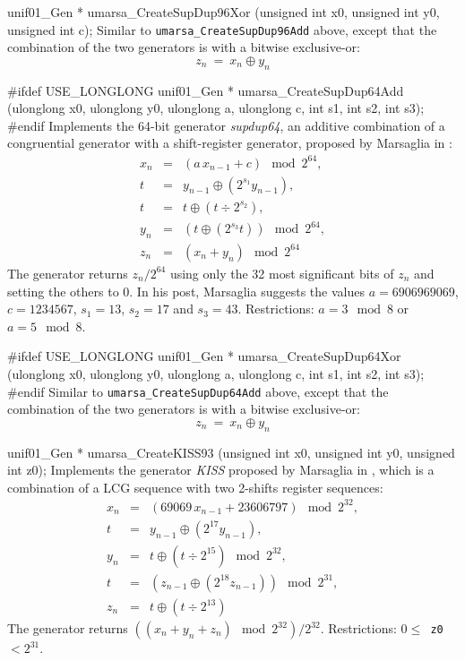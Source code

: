 unif01_Gen * umarsa_CreateSupDup96Xor (unsigned int x0, unsigned int y0,
                                       unsigned int c);
\endcode
 \tab Similar to {\tt umarsa\_CreateSupDup96Add} above, except that
  the combination of the two generators is with a bitwise exclusive-or:
  $$
   z_n \  = \ x_n \oplus  y_{n}
  $$
  \endtab
\code


#ifdef USE_LONGLONG
unif01_Gen * umarsa_CreateSupDup64Add (ulonglong x0, ulonglong y0,
                                       ulonglong a, ulonglong c,
                                       int s1, int s2, int s3);
#endif
\endcode
 \tab Implements the 64-bit generator {\it supdup64}, an additive
  combination of
%
  a congruential generator with a shift-register generator, proposed by
  Marsaglia in \cite{rMAR02a}:
  \begin {eqnarray*}
   x_n &=& (a\, x_{n-1} + c) \mod 2^{64}, \\
   t &=& y_{n-1}\oplus \left(2^{s_1}y_{n-1}\right), \\
   t &=& t \oplus \left(t\div  2^{s_2}\right), \\
   y_{n} &=& \left(t \oplus \left(2^{s_3} t\right)\right) \mod 2^{64}, \\
   z_n &=& (x_n + y_{n}) \mod 2^{64}
  \end {eqnarray*} 
   The generator returns  $z_n/2^{64}$ using only the 32 most significant
   bits of $z_n$ and setting the others to 0.
   In his post, Marsaglia suggests the values $a = 6906969069$,
   $c=1234567$, $s_1 = 13$, $s_2 = 17$ and $s_3 = 43$.
   Restrictions: $a = 3 \mod 8$ or $a = 5 \mod 8$.
  \endtab
\code
    

#ifdef USE_LONGLONG
unif01_Gen * umarsa_CreateSupDup64Xor (ulonglong x0, ulonglong y0,
                                       ulonglong a, ulonglong c,
                                       int s1, int s2, int s3);
#endif
\endcode
 \tab Similar to {\tt umarsa\_CreateSupDup64Add} above, except that
  the combination of the two generators is with a bitwise exclusive-or:
  $$
   z_n \  = \ x_n \oplus  y_{n}
  $$
  \endtab
\code


unif01_Gen * umarsa_CreateKISS93 (unsigned int x0, unsigned int y0,
                                  unsigned int z0);
\endcode
 \tab Implements the generator {\it KISS}
 proposed by Marsaglia in \cite{rMAR93c}, 
%
   which is a combination of a LCG sequence with two 2-shifts register
   sequences:
  \begin {eqnarray*}
   x_n &=& (69069\, x_{n-1} + 23606797) \mod 2^{32}, \\
   t &=& y_{n-1}\oplus \left(2^{17} y_{n-1}\right), \\
   y_{n} &=& t \oplus \left(t\div 2^{15}\right) \mod 2^{32}, \\
   t &=& \left(z_{n-1}\oplus \left(2^{18} z_{n-1}\right)\right) \mod 2^{31},\\
   z_n &=& t \oplus \left(t \div 2^{13}\right)
  \end {eqnarray*} 
   The generator returns
   $\left((x_n + y_n + z_n) \mod 2^{32}\right) / 2^{32}$.
   Restrictions: {\tt $0 \le$ z0 $< 2^{31}$}.
  \endtab
\code
 

